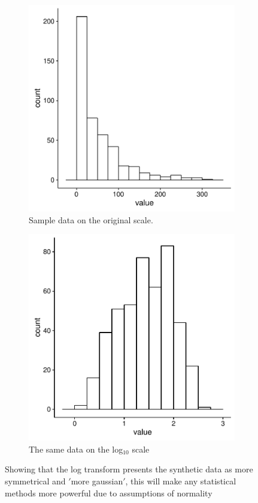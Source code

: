 \begin{figure}
\centering
\begin{subfigure}{.49\textwidth}
	\centering
	\includegraphics[width=\linewidth]{xenograph/normalisation/data_hist.pdf}
	\caption{Sample data on the original scale.}
	\label{tumour_data}
\end{subfigure}
\begin{subfigure}{.49\textwidth}
	\centering
	\includegraphics[width=\linewidth]{xenograph/normalisation/log_data_hist.pdf}
	\caption{The same data on the log$_{10}$ scale}
	\label{log_tumour_data}
\end{subfigure}
\caption{Showing that the log transform presents the synthetic data as more symmetrical and  $'$more gaussian$'$, this will make any statistical methods more powerful due to assumptions of normality}
\label{tumour_histograms}
\end{figure}

